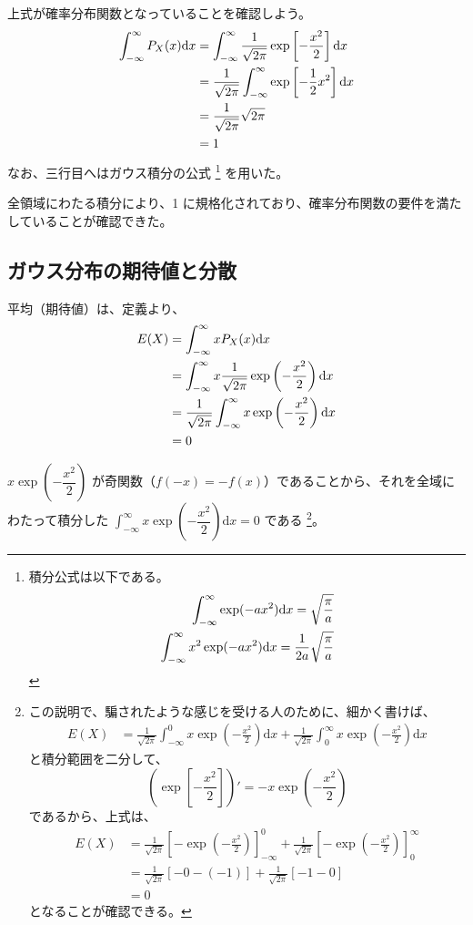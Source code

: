 \documentclass[uplatex,dvipdfmx,a4paper,11pt, titlepage]{jsarticle}
\newcommand{\diff}{\mathrm d}
\begin{document}
\begin{appendix}
上式が確率分布関数となっていることを確認しよう。
\begin{align}
\int_{-\infty}^{\infty} P_X(x) \diff x
	&= \int_{-\infty}^{\infty} \frac{1}{\sqrt{2 \pi}} \exp \left[- \frac{x^2}{2} \right] \diff x \notag \\
	&= \frac{1}{\sqrt{2 \pi}} \int_{-\infty}^{\infty} \exp \left[- \frac{1}{2} x^2 \right] \diff x \notag \\
	&= \dfrac{1}{\sqrt{2 \pi}} \sqrt{2 \pi} \notag \\
	&=1
\end{align}
なお、三行目へはガウス積分の公式
\footnote{
積分公式は以下である。
\begin{eqnarray}
  \int_{-\infty}^{\infty} \exp(-a x^2) \diff x = \sqrt{\frac{\pi}{a}} \notag \\
  \int_{-\infty}^{\infty} x^2 \exp(- a x^2) \diff x = \frac{1}{2a}  \sqrt{\frac{\pi}{a}} \notag
\end{eqnarray}
}
を用いた。

全領域にわたる積分により、1 に規格化されており、確率分布関数の要件を満たしていることが確認できた。

\subsection{ガウス分布の期待値と分散}

平均（期待値）は、定義より、
\begin{align}
E(X) &= \int_{-\infty}^{\infty} x P_X(x) \diff x \notag \\
	&= \int_{-\infty}^{\infty} x \frac{1}{\sqrt{2 \pi}} \exp \left(- \frac{x^2}{2} \right) \diff x \notag \\
	&= \frac{1}{\sqrt{2 \pi}} \int_{-\infty}^{\infty} x \exp \left(- \frac{x^2}{2} \right) \diff x \notag \\
	&= 0
\end{align}

$x \exp \left(- \dfrac{x^2}{2} \right)$ が奇関数（$f(-x) = -f(x)$）であることから、それを全域にわたって積分した
$\displaystyle \int_{-\infty}^{\infty} x \exp \left(- \dfrac{x^2}{2} \right) \diff x =0$ である
\footnote{
この説明で、騙されたような感じを受ける人のために、細かく書けば、
\begin{align*}
E(X) 
	&= \frac{1}{\sqrt{2 \pi}} \int_{-\infty}^{0} x \exp \left(- \frac{x^2}{2} \right) \diff x 
	+ \frac{1}{\sqrt{2 \pi}} \int_{0}^{\infty} x \exp \left(- \frac{x^2}{2} \right) \diff x
\end{align*}
と積分範囲を二分して、
\begin{equation*}
\left(\exp \left[- \frac{x^2}{2} \right] \right)' = -x \exp \left(- \frac{x^2}{2} \right)
\end{equation*}
であるから、上式は、
\begin{align*}
E(X)
	&= \frac{1}{\sqrt{2 \pi}} \left[ - \exp \left(- \frac{x^2}{2} \right)\right]_{-\infty}^{0}
	+\frac{1}{\sqrt{2 \pi}} \left[ - \exp \left(- \frac{x^2}{2} \right)\right]_{0}^{\infty} \\
	&= \frac{1}{\sqrt{2 \pi}} [ -0 -(-1) ] + \frac{1}{\sqrt{2 \pi}} [-1 -0] \\
	&=0
\end{align*}
となることが確認できる。
}。


\end{appendix}
\end{document}
